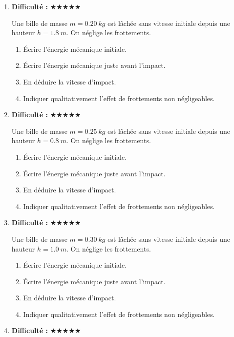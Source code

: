 \documentclass[11pt,a4paper]{article}
\newcommand{\etoiles}[1]{\textbf{Difficulté : }#1}
\begin{document}
\begin{enumerate}[label=\textbf{Exercice \arabic*.},leftmargin=*]
Une bille de masse $m=0.15\ \si{kg}$ est lâchée sans vitesse initiale depuis une hauteur $h=1.6\ \si{m}$.
On néglige les frottements.
\begin{enumerate}[label=\alph*)]
\item Écrire l'énergie mécanique initiale.
\item Écrire l'énergie mécanique juste avant l'impact.
\item En déduire la vitesse d'impact.
\item Indiquer qualitativement l'effet de frottements non négligeables.
\end{enumerate}
\item \etoiles{★★★★★}

Une bille de masse $m=0.20\ \si{kg}$ est lâchée sans vitesse initiale depuis une hauteur $h=1.8\ \si{m}$.
On néglige les frottements.
\begin{enumerate}[label=\alph*)]
\item Écrire l'énergie mécanique initiale.
\item Écrire l'énergie mécanique juste avant l'impact.
\item En déduire la vitesse d'impact.
\item Indiquer qualitativement l'effet de frottements non négligeables.
\end{enumerate}
\item \etoiles{★★★★★}

Une bille de masse $m=0.25\ \si{kg}$ est lâchée sans vitesse initiale depuis une hauteur $h=0.8\ \si{m}$.
On néglige les frottements.
\begin{enumerate}[label=\alph*)]
\item Écrire l'énergie mécanique initiale.
\item Écrire l'énergie mécanique juste avant l'impact.
\item En déduire la vitesse d'impact.
\item Indiquer qualitativement l'effet de frottements non négligeables.
\end{enumerate}
\item \etoiles{★★★★★}

Une bille de masse $m=0.30\ \si{kg}$ est lâchée sans vitesse initiale depuis une hauteur $h=1.0\ \si{m}$.
On néglige les frottements.
\begin{enumerate}[label=\alph*)]
\item Écrire l'énergie mécanique initiale.
\item Écrire l'énergie mécanique juste avant l'impact.
\item En déduire la vitesse d'impact.
\item Indiquer qualitativement l'effet de frottements non négligeables.
\end{enumerate}
\item \etoiles{★★★★★}


\end{enumerate}
\end{document}
